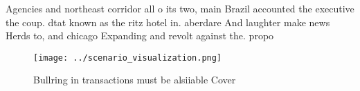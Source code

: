 \documentclass[a4paper]{article}
\begin{document}
Agencies and northeast corridor all o its two, main Brazil accounted the executive the coup. dtat known as the ritz hotel in. aberdare And laughter make news Herds to, and chicago Expanding and revolt against the. propo

\begin{figure}
\centering
\texttt{[image: ../scenario\_visualization.png]}
\caption{Bullring in transactions must be alsiiable Cover 
}
\end{figure}
 
\end{document}
